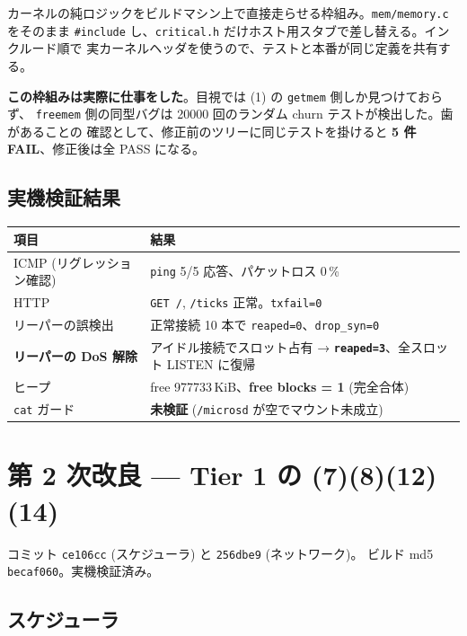 \documentclass[a4paper,11pt]{ltjsarticle}
\begin{document}
カーネルの純ロジックをビルドマシン上で直接走らせる枠組み。\texttt{mem/memory.c} をそのまま
\texttt{\#include} し、\texttt{critical.h} だけホスト用スタブで差し替える。インクルード順で
実カーネルヘッダを使うので、テストと本番が同じ定義を共有する。

\textbf{この枠組みは実際に仕事をした}。目視では (1) の \texttt{getmem} 側しか見つけておらず、
\texttt{freemem} 側の同型バグは 20000 回のランダム churn テストが検出した。歯があることの
確認として、修正前のツリーに同じテストを掛けると\textbf{ 5 件 FAIL}、修正後は全 PASS になる。

\subsection{実機検証結果}

\begin{center}\small
\begin{tabular}{@{}p{6.2cm} p{8.6cm}@{}}
\toprule
\textbf{項目} & \textbf{結果}\\ \midrule
ICMP (リグレッション確認)   & \texttt{ping} 5/5 応答、パケットロス 0\,\%\\
HTTP                        & \texttt{GET /}, \texttt{/ticks} 正常。\texttt{txfail=0}\\
リーパーの誤検出            & 正常接続 10 本で \texttt{reaped=0}、\texttt{drop\_syn=0}\\
\textbf{リーパーの DoS 解除}& アイドル接続でスロット占有 → \textbf{\texttt{reaped=3}}、全スロット LISTEN に復帰\\
ヒープ                      & free 977733\,KiB、\textbf{free blocks = 1} (完全合体)\\
\texttt{cat} ガード         & \textbf{未検証} (\texttt{/microsd} が空でマウント未成立)\\
\bottomrule
\end{tabular}
\end{center}

\section{第 2 次改良 --- Tier 1 の (7)(8)(12)(14)}

コミット \texttt{ce106cc} (スケジューラ) と \texttt{256dbe9} (ネットワーク)。
ビルド md5 \texttt{becaf060}。実機検証済み。

\subsection{スケジューラ}
\end{document}
